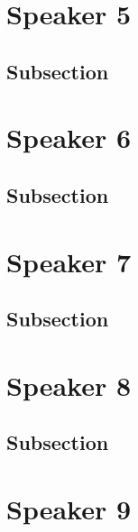 \documentclass[
]{book}
\begin{document}
\hypertarget{speaker-5}{%
\chapter*{Speaker 5}\label{speaker-5}}

\hypertarget{subsection-18}{%
\section{Subsection}\label{subsection-18}}

\hypertarget{speaker-6}{%
\chapter*{Speaker 6}\label{speaker-6}}

\hypertarget{subsection-19}{%
\section{Subsection}\label{subsection-19}}

\hypertarget{speaker-7-1}{%
\chapter*{Speaker 7}\label{speaker-7-1}}

\hypertarget{subsection-20}{%
\section{Subsection}\label{subsection-20}}

\hypertarget{speaker-8-1}{%
\chapter*{Speaker 8}\label{speaker-8-1}}

\hypertarget{subsection-21}{%
\section{Subsection}\label{subsection-21}}

\hypertarget{speaker-9-1}{%
\chapter*{Speaker 9}\label{speaker-9-1}}
\end{document}
